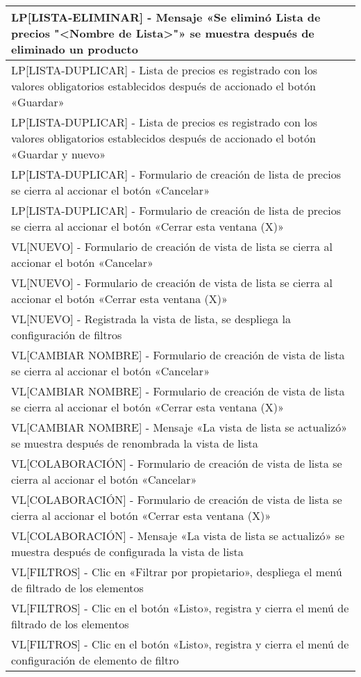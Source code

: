 \begin{longtable}{|p{15.0cm}|}
LP[LISTA-ELIMINAR] - Mensaje «Se eliminó Lista de precios "<Nombre de Lista>"» se muestra después de eliminado un producto \\ \hline
LP[LISTA-DUPLICAR] - Lista de precios es registrado con los valores obligatorios establecidos después de accionado el botón «Guardar» \\ \hline
LP[LISTA-DUPLICAR] - Lista de precios es registrado con los valores obligatorios establecidos después de accionado el botón «Guardar y nuevo» \\ \hline
LP[LISTA-DUPLICAR] - Formulario de creación de lista de precios se cierra al accionar el botón «Cancelar» \\ \hline
LP[LISTA-DUPLICAR] - Formulario de creación de lista de precios se cierra al accionar el botón «Cerrar esta ventana (X)» \\ \hline
VL[NUEVO] - Formulario de creación de vista de lista se cierra al accionar el botón «Cancelar» \\ \hline
VL[NUEVO] - Formulario de creación de vista de lista se cierra al accionar el botón «Cerrar esta ventana (X)» \\ \hline
VL[NUEVO] - Registrada la vista de lista, se despliega la configuración de filtros \\ \hline
VL[CAMBIAR NOMBRE] - Formulario de creación de vista de lista se cierra al accionar el botón «Cancelar» \\ \hline
VL[CAMBIAR NOMBRE] - Formulario de creación de vista de lista se cierra al accionar el botón «Cerrar esta ventana (X)» \\ \hline
VL[CAMBIAR NOMBRE] - Mensaje «La vista de lista se actualizó» se muestra después de renombrada la vista de lista \\ \hline
VL[COLABORACIÓN] - Formulario de creación de vista de lista se cierra al accionar el botón «Cancelar» \\ \hline
VL[COLABORACIÓN] - Formulario de creación de vista de lista se cierra al accionar el botón «Cerrar esta ventana (X)» \\ \hline
VL[COLABORACIÓN] - Mensaje «La vista de lista se actualizó» se muestra después de configurada la vista de lista \\ \hline
VL[FILTROS] - Clic en «Filtrar por propietario», despliega el menú de filtrado de los elementos \\ \hline
VL[FILTROS] - Clic en el botón «Listo», registra y cierra el menú de filtrado de los elementos \\ \hline
VL[FILTROS] - Clic en el botón «Listo», registra y cierra el menú de configuración de elemento de filtro \\ \hline

\end{longtable}
